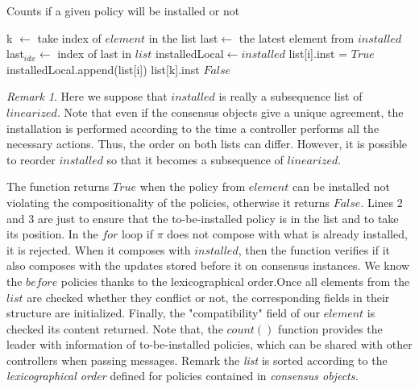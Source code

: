 \documentclass{article}
\theoremstyle{remark}
\newtheorem*{remark}{Remark}
\begin{document}
\begin{algorithm}
\caption{Counts if a given policy will be installed or not}
\begin{algorithmic}[1]
		\State k $\gets$ take index of $element$ in the list
	\EndIf
		\State last$\gets$ the latest element from $installed$
		\State last$_{idx}\gets$ index of last in $list$
		\State installedLocal$\gets installed$
				\State list[i].inst = $True$
				\State installedLocal.append(list[i])
			\EndIf	
		\EndFor		
		\State\Return list[k].inst
	\EndIf			
	\State\Return $False$
	\EndProcedure
\end{algorithmic}
\end{algorithm}
\begin{remark}
Here we suppose that $installed$ is really a subsequence list of $linearized$. Note that even if the consensus objects give a unique agreement, the installation is performed according to the time a controller performs all the necessary actions. Thus, the order on both lists can differ. However, it is possible to reorder $installed$ so that it becomes a subsequence of $linearized$.
\end{remark} 
The function returns $True$ when the policy from $element$ can be installed not violating the compositionality of the policies, otherwise it returns $False$. Lines 2 and 3 are just to ensure that the to-be-installed policy is in the list and to take its position. In the $for$ loop if $\pi$ does not compose with what is already installed, it is rejected. When it composes with $installed$, then the function verifies if it also composes with the updates stored before it on consensus instances. We know the $before$ policies thanks to the lexicographical order.Once all elements from the $list$ are checked whether they conflict or not, the corresponding fields in their structure are initialized. Finally, the "compatibility" field of our $element$ is checked its content returned. 
Note that, the $count()$ function provides the leader with information of to-be-installed policies, which can be shared with other controllers when passing messages. 
Remark the \emph{list} is sorted according to the \emph{lexicographical order} defined for policies contained in \emph{consensus objects.} \\
\end{document}
